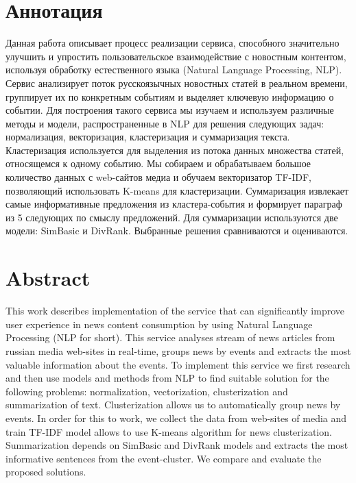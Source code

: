 \titleformat{\section}[block]
{\centering\fontsize{16pt}{18pt}\selectfont\bfseries}{\thesection\cftsecaftersnum}{0.5em}{} %

\section*{Аннотация}
Данная работа описывает процесс реализации сервиса, способного значительно улучшить
и упростить пользовательское взаимодействие с новостным контентом, используя обработку
естественного языка (Natural Language Processing, NLP). Сервис анализирует поток русскоязычных новостных статей в реальном времени, группирует их по конкретным событиям и выделяет ключевую информацию о событии.
Для построения такого сервиса мы изучаем и используем различные методы и модели, распространенные в NLP для решения следующих задач:
нормализация, векторизация, кластеризация и суммаризация текста.
Кластеризация используется для выделения из потока данных множества статей, относящемся к одному событию.
Мы собираем и обрабатываем большое количество данных с web-сайтов медиа и обучаем векторизатор TF-IDF, позволяющий использовать K-means для кластеризации.
Суммаризация извлекает самые информативные предложения из кластера-события и формирует параграф из 5 следующих по смыслу предложений. Для суммаризации используются две модели: SimBasic и DivRank. Выбранные решения сравниваются и оцениваются.


\section*{Abstract}
This work describes implementation of the service that can significantly improve user experience in news content consumption by using Natural Language Processing (NLP for short). This service analyses stream of news articles from russian media web-sites in real-time, groups news by events and extracts the most valuable information about the events.
To implement this service we first research and then use models and methods from NLP to find suitable solution for the following problems: normalization, vectorization, clusterization and summarization of text.
Clusterization allows us to automatically group news by events. In order for this to work, we collect the data from web-sites of media and train TF-IDF model allows to use K-means algorithm for news clusterization. Summarization depends on SimBasic and DivRank models and extracts the most informative sentences from the event-cluster. We compare and evaluate the proposed solutions.

\titleformat{\section}[block]
{\raggedright\fontsize{16pt}{18pt}\selectfont\bfseries}{\thesection\cftsecaftersnum}{0.5em}{} %